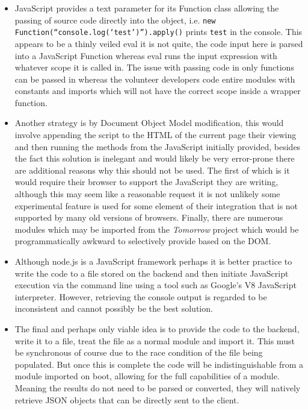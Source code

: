 \documentclass[jou,apacite]{apa6}
\begin{document}
\begin{itemize}
  		\setlength\itemsep{-0.2em}
		\item JavaScript provides a text parameter for its Function class allowing the passing of source code directly into the object, i.e. \texttt{new Function(“console.log(‘test’)”).apply()} prints \texttt{test} in the console. This appears to be a thinly veiled eval it is not quite, the code input here is parsed into a JavaScript Function whereas eval runs the input expression with whatever scope it is called in. The issue with passing code in only functions can be passed in whereas the volunteer developers code entire modules with constants and imports which will not have the correct scope inside a wrapper function.
		\item Another strategy is by Document Object Model modification, this would involve appending the script to the HTML of the current page their viewing and then running the methods from the JavaScript initially provided, besides the fact this solution is inelegant and would likely be very error-prone there are additional reasons why this should not be used. The first of which is it would require their browser to support the JavaScript they are writing, although this may seem like a reasonable request it is not unlikely some experimental feature is used for some element of their integration that is not supported by many old versions of browsers. Finally, there are numerous modules which may be imported from the \textit{Tomorrow} project which would be programmatically awkward to selectively provide based on the DOM. 
		\item Although node.js is a JavaScript framework perhaps it is better practice to write the code to a file stored on the backend and then initiate JavaScript execution via the command line using a tool such as Google’s V8 JavaScript interpreter. However, retrieving the console output is regarded to be inconsistent and cannot possibly be the best solution.
		\item The final and perhaps only viable idea is to provide the code to the backend, write it to a file, treat the file as a normal module and import it. This must be synchronous of course due to the race condition of the file being populated. But once this is complete the code will be indistinguishable from a module imported on boot, allowing for the full capabilities of a module. Meaning the results do not need to be parsed or converted, they will natively retrieve JSON objects that can be directly sent to the client.
		
	\end{itemize}
	
\end{document}
